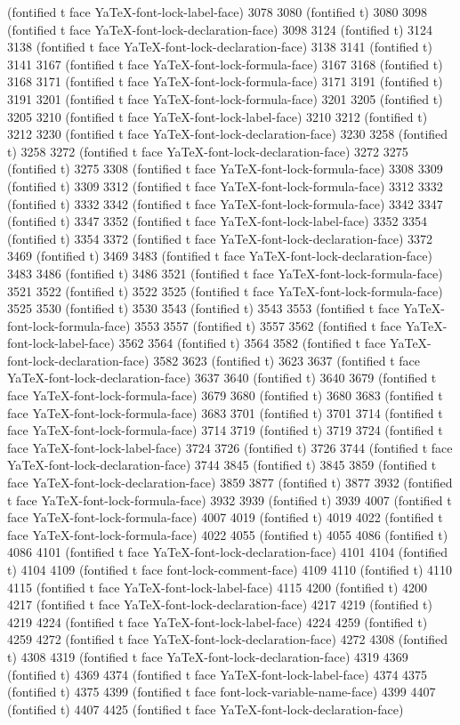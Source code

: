 (fontified t face YaTeX-font-lock-label-face) 3078 3080 (fontified t) 3080 3098 (fontified t face YaTeX-font-lock-declaration-face) 3098 3124 (fontified t) 3124 3138 (fontified t face YaTeX-font-lock-declaration-face) 3138 3141 (fontified t) 3141 3167 (fontified t face YaTeX-font-lock-formula-face) 3167 3168 (fontified t) 3168 3171 (fontified t face YaTeX-font-lock-formula-face) 3171 3191 (fontified t) 3191 3201 (fontified t face YaTeX-font-lock-formula-face) 3201 3205 (fontified t) 3205 3210 (fontified t face YaTeX-font-lock-label-face) 3210 3212 (fontified t) 3212 3230 (fontified t face YaTeX-font-lock-declaration-face) 3230 3258 (fontified t) 3258 3272 (fontified t face YaTeX-font-lock-declaration-face) 3272 3275 (fontified t) 3275 3308 (fontified t face YaTeX-font-lock-formula-face) 3308 3309 (fontified t) 3309 3312 (fontified t face YaTeX-font-lock-formula-face) 3312 3332 (fontified t) 3332 3342 (fontified t face YaTeX-font-lock-formula-face) 3342 3347 (fontified t) 3347 3352 (fontified t face YaTeX-font-lock-label-face) 3352 3354 (fontified t) 3354 3372 (fontified t face YaTeX-font-lock-declaration-face) 3372 3469 (fontified t) 3469 3483 (fontified t face YaTeX-font-lock-declaration-face) 3483 3486 (fontified t) 3486 3521 (fontified t face YaTeX-font-lock-formula-face) 3521 3522 (fontified t) 3522 3525 (fontified t face YaTeX-font-lock-formula-face) 3525 3530 (fontified t) 3530 3543 (fontified t) 3543 3553 (fontified t face YaTeX-font-lock-formula-face) 3553 3557 (fontified t) 3557 3562 (fontified t face YaTeX-font-lock-label-face) 3562 3564 (fontified t) 3564 3582 (fontified t face YaTeX-font-lock-declaration-face) 3582 3623 (fontified t) 3623 3637 (fontified t face YaTeX-font-lock-declaration-face) 3637 3640 (fontified t) 3640 3679 (fontified t face YaTeX-font-lock-formula-face) 3679 3680 (fontified t) 3680 3683 (fontified t face YaTeX-font-lock-formula-face) 3683 3701 (fontified t) 3701 3714 (fontified t face YaTeX-font-lock-formula-face) 3714 3719 (fontified t) 3719 3724 (fontified t face YaTeX-font-lock-label-face) 3724 3726 (fontified t) 3726 3744 (fontified t face YaTeX-font-lock-declaration-face) 3744 3845 (fontified t) 3845 3859 (fontified t face YaTeX-font-lock-declaration-face) 3859 3877 (fontified t) 3877 3932 (fontified t face YaTeX-font-lock-formula-face) 3932 3939 (fontified t) 3939 4007 (fontified t face YaTeX-font-lock-formula-face) 4007 4019 (fontified t) 4019 4022 (fontified t face YaTeX-font-lock-formula-face) 4022 4055 (fontified t) 4055 4086 (fontified t) 4086 4101 (fontified t face YaTeX-font-lock-declaration-face) 4101 4104 (fontified t) 4104 4109 (fontified t face font-lock-comment-face) 4109 4110 (fontified t) 4110 4115 (fontified t face YaTeX-font-lock-label-face) 4115 4200 (fontified t) 4200 4217 (fontified t face YaTeX-font-lock-declaration-face) 4217 4219 (fontified t) 4219 4224 (fontified t face YaTeX-font-lock-label-face) 4224 4259 (fontified t) 4259 4272 (fontified t face YaTeX-font-lock-declaration-face) 4272 4308 (fontified t) 4308 4319 (fontified t face YaTeX-font-lock-declaration-face) 4319 4369 (fontified t) 4369 4374 (fontified t face YaTeX-font-lock-label-face) 4374 4375 (fontified t) 4375 4399 (fontified t face font-lock-variable-name-face) 4399 4407 (fontified t) 4407 4425 (fontified t face YaTeX-font-lock-declaration-face) 